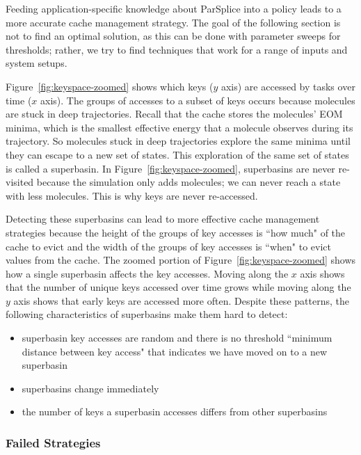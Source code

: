 Feeding application-specific knowledge about ParSplice into a policy
leads to a more accurate cache management strategy.  The goal of the following
section is not to find an optimal solution, as this can be done with parameter
sweeps for thresholds; rather, we try to find techniques that work for a range
of inputs and system setups.

Figure~\ref{fig:keyspace-zoomed} shows which keys (\(y\) axis) are accessed by
tasks over time (\(x\) axis). The groups of accesses to a subset of keys occurs
because molecules are stuck in deep trajectories. Recall that the cache stores
the molecules' EOM minima, which is the smallest effective energy that a
molecule observes during its trajectory. So molecules stuck in deep
trajectories explore the same minima until they can escape to a new set of
states. This exploration of the same set of states is called a superbasin.  In
Figure~\ref{fig:keyspace-zoomed}, superbasins are never re-visited because the
simulation only adds molecules; we can never reach a state with less molecules.
This is why keys are never re-accessed.  

Detecting these superbasins can lead to more effective cache management
strategies because the height of the groups of key accesses is ``how much" of
the cache to evict and the width of the groups of key accesses is ``when" to
evict values from the cache.  The zoomed portion of
Figure~\ref{fig:keyspace-zoomed} shows how a single superbasin affects the key
accesses. Moving along the \(x\) axis shows that the number of unique keys
accessed over time grows while moving along the \(y\) axis shows that early
keys are accessed more often.  Despite these patterns, the following
characteristics of superbasins make them hard to detect:

\begin{itemize}

  \item superbasin key accesses are random and there is no threshold ``minimum distance
  between key access" that indicates we have moved on to a new superbasin

  \item superbasins change immediately

  \item the number of keys a superbasin accesses differs from other superbasins

\end{itemize}

\subsubsection{Failed Strategies}

